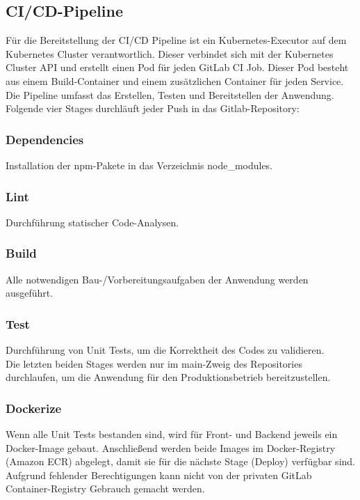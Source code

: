 \documentclass[letterpaper, 10 pt, conference]{ieeeconf}
\begin{document}
\subsection{CI/CD-Pipeline}

Für die Bereitstellung der CI/CD Pipeline ist ein Kubernetes-Executor\cite{c1} auf dem Kubernetes Cluster verantwortlich.  Dieser verbindet sich mit der Kubernetes Cluster API und erstellt einen Pod für jeden GitLab CI Job. Dieser Pod besteht aus einem Build-Container und einem zusätzlichen Container für jeden Service. Die Pipeline umfasst das Erstellen, Testen und Bereitstellen der Anwendung.  Folgende vier Stages durchläuft jeder Push in das Gitlab-Repository:

\subsubsection{Dependencies}

Installation der npm-Pakete in das Verzeichnis node\_modules.

\subsubsection{Lint}

Durchführung statischer Code-Analysen.

\subsubsection{Build}

Alle notwendigen Bau-/Vorbereitungsaufgaben der Anwendung werden ausgeführt.

\subsubsection{Test}

Durchführung von Unit Tests, um die Korrektheit des Codes zu validieren.  \\

Die letzten beiden Stages werden nur im main-Zweig des Repositories durchlaufen, um die Anwendung für den Produktionsbetrieb bereitzustellen.

\subsubsection{Dockerize}

Wenn alle Unit Tests bestanden sind, wird für Front- und Backend jeweils ein Docker-Image gebaut. Anschließend werden beide Images im Docker-Registry (Amazon ECR) abgelegt, damit sie für die nächste Stage (Deploy) verfügbar sind.  Aufgrund fehlender Berechtigungen kann nicht von der privaten GitLab Container-Registry Gebrauch gemacht werden.
\end{document}
